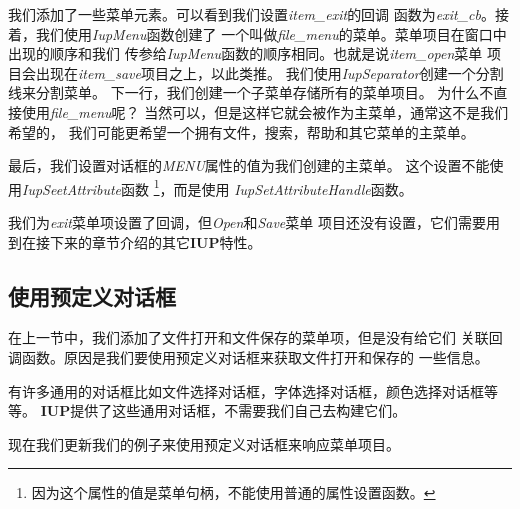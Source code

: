 \documentclass{ctexart}
\begin{document}
我们添加了一些菜单元素。可以看到我们设置\emph{item\_exit}的回调
函数为\emph{exit\_cb}。接着，我们使用\emph{IupMenu}函数创建了
一个叫做\emph{file\_menu}的菜单。菜单项目在窗口中出现的顺序和我们
传参给\emph{IupMenu}函数的顺序相同。也就是说\emph{item\_open}菜单
项目会出现在\emph{item\_save}项目之上，以此类推。
我们使用\emph{IupSeparator}创建一个分割线来分割菜单。
下一行，我们创建一个子菜单存储所有的菜单项目。
为什么不直接使用\emph{file\_menu}呢？
当然可以，但是这样它就会被作为主菜单，通常这不是我们希望的，
我们可能更希望一个拥有文件，搜索，帮助和其它菜单的主菜单。

最后，我们设置对话框的\emph{MENU}属性的值为我们创建的主菜单。
这个设置不能使用\emph{IupSeetAttribute}函数
\footnote{因为这个属性的值是菜单句柄，不能使用普通的属性设置函数。}，而是使用
\emph{IupSetAttributeHandle}函数。

我们为\emph{exit}菜单项设置了回调，但\emph{Open}和\emph{Save}菜单
项目还没有设置，它们需要用到在接下来的章节介绍的其它\textbf{IUP}特性。

\subsection{使用预定义对话框}

在上一节中，我们添加了文件打开和文件保存的菜单项，但是没有给它们
关联回调函数。原因是我们要使用预定义对话框来获取文件打开和保存的
一些信息。

有许多通用的对话框比如文件选择对话框，字体选择对话框，颜色选择对话框等等。
\textbf{IUP}提供了这些通用对话框，不需要我们自己去构建它们。

现在我们更新我们的例子来使用预定义对话框来响应菜单项目。
\end{document}
